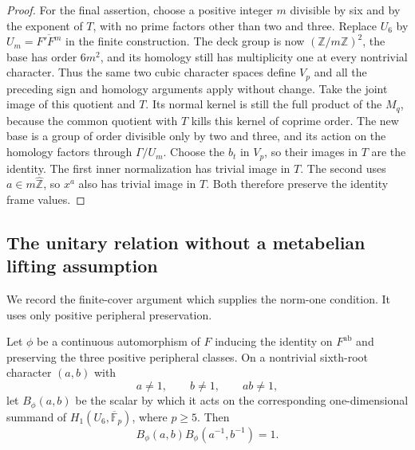 \begin{proof}
For the final assertion, choose a positive integer $m$ divisible by
six and by the exponent of $T$, with no prime factors other than two
and three. Replace $U_6$ by $U_m=\overline{F'F^m}$ in the finite
construction. The deck group is now $(\mathbb Z/m\mathbb Z)^2$,
the base has order $6m^2$, and its homology still has multiplicity
one at every nontrivial character. Thus the same two cubic character
spaces define $V_p$ and all the preceding sign and homology arguments
apply without change. Take the joint image of this quotient and $T$.
Its normal kernel is still the full product of the $M_q$, because
the common quotient with $T$ kills this kernel of coprime order.
The new base is a group of order divisible only by two and three,
and its action on the homology factors through $\Gamma/U_m$.
Choose the $b_t$ in $V_p$, so their images in $T$ are the identity.
The first inner normalization has trivial image in $T$. The second
uses $a\in m\widehat{\mathbb Z}$, so $x^a$ also has trivial image
in $T$. Both therefore preserve the identity frame values.
\end{proof}

\subsection{The unitary relation without a metabelian lifting assumption}

We record the finite-cover argument which supplies the norm-one
condition. It uses only positive peripheral preservation.

\begin{lemma}\label{lem:cover-unitarity}
Let $\phi$ be a continuous automorphism of $F$ inducing the identity
on $F^{\mathrm{ab}}$ and preserving the three positive peripheral
classes. On a nontrivial sixth-root character $(a,b)$ with
\[
 a\ne1,\qquad b\ne1,\qquad ab\ne1,
\]
let $B_\phi(a,b)$ be the scalar by which it acts on the corresponding
one-dimensional summand of $H_1(U_6,\overline{\mathbb F}_p)$,
where $p\geq5$. Then
\[
 B_\phi(a,b)B_\phi(a^{-1},b^{-1})=1.
\]
\end{lemma}

